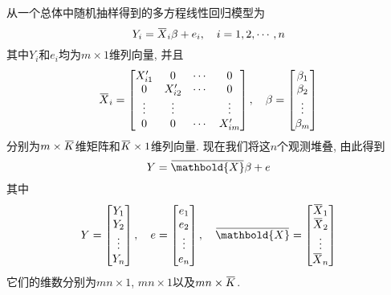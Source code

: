 \documentclass[cn, 12pt, math=mtpro2, bibstyle=apa, blue, twocol]{elegantbook}
\newcommand{\overbar}[1]{\mkern 1.5mu\overline{\mkern-1.5mu#1\mkern-1.5mu}\mkern 1.5mu}
\begin{document}
从一个总体中随机抽样得到的多方程线性回归模型为
\begin{equation}\label{eq5.3}
  Y_i=\overbar{X}_i\beta+e_i,\quad i=1,2,\cdots,n
\end{equation}
其中$Y_i$和$e_i$均为$m\times1$维列向量, 并且
$$\overbar{X}_i=\begin{bmatrix}
                              X_{i1}' & 0 & \cdots & 0 \\
                              0 & X_{i2}' & \cdots & 0 \\
                              \vdots & \vdots &  & \vdots \\
                              0 & 0 & \cdots & X_{im}'
                            \end{bmatrix},\quad \beta=\begin{bmatrix}
                                                        \beta_1 \\
                                                        \beta_2 \\
                                                        \vdots \\
                                                        \beta_m
                                                      \end{bmatrix}$$
分别为$m\times\overbar{K}$维矩阵和$\overbar{K}\times1$维列向量. 现在我们将这$n$个观测堆叠, 由此得到
$$Y=\overbar{\mathbold{X}}\beta+e$$
其中
$$Y=\begin{bmatrix}
      Y_1 \\
      Y_2 \\
      \vdots \\
      Y_n
    \end{bmatrix},\quad e=\begin{bmatrix}
                            e_1 \\
                            e_2 \\
                            \vdots \\
                            e_n
                          \end{bmatrix},\quad \overbar{\mathbold{X}}=\begin{bmatrix}
                                                             \overbar{X}_1 \\
                                                             \overbar{X}_2 \\
                                                             \vdots \\
                                                             \overbar{X}_n
                                                           \end{bmatrix}$$
它们的维数分别为$mn\times1$, $mn\times1$以及$mn\times \overbar{K}$.
\end{document}
